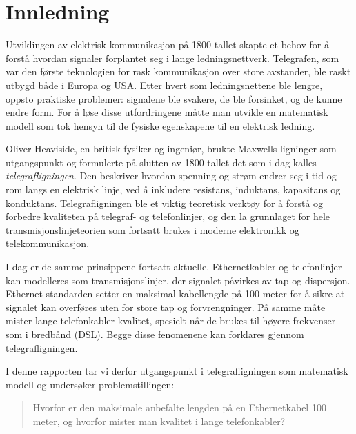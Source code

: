 \section{Innledning}

Utviklingen av elektrisk kommunikasjon på 1800-tallet skapte et behov for å forstå hvordan 
signaler forplantet seg i lange ledningsnettverk. Telegrafen, som var den første teknologien 
for rask kommunikasjon over store avstander, ble raskt utbygd både i Europa og USA. Etter hvert 
som ledningsnettene ble lengre, oppsto praktiske problemer: signalene ble svakere, de ble 
forsinket, og de kunne endre form. For å løse disse utfordringene måtte man utvikle en matematisk 
modell som tok hensyn til de fysiske egenskapene til en elektrisk ledning.

Oliver Heaviside, en britisk fysiker og ingeniør, brukte Maxwells ligninger som utgangspunkt og 
formulerte på slutten av 1800-tallet det som i dag kalles \textit{telegrafligningen}. Den beskriver 
hvordan spenning og strøm endrer seg i tid og rom langs en elektrisk linje, ved å inkludere 
resistans, induktans, kapasitans og konduktans. Telegrafligningen ble et viktig teoretisk verktøy 
for å forstå og forbedre kvaliteten på telegraf- og telefonlinjer, og den la grunnlaget for hele 
transmisjonslinjeteorien som fortsatt brukes i moderne elektronikk og telekommunikasjon.

I dag er de samme prinsippene fortsatt aktuelle. Ethernetkabler og telefonlinjer kan modelleres 
som transmisjonslinjer, der signalet påvirkes av tap og dispersjon. Ethernet-standarden setter en 
maksimal kabellengde på 100 meter for å sikre at signalet kan overføres uten for store tap og 
forvrengninger. På samme måte mister lange telefonkabler kvalitet, spesielt når de brukes til høyere 
frekvenser som i bredbånd (DSL). Begge disse fenomenene kan forklares gjennom telegrafligningen.

I denne rapporten tar vi derfor utgangspunkt i telegrafligningen som matematisk modell og undersøker 
problemstillingen:

\begin{quote}
Hvorfor er den maksimale anbefalte lengden på en Ethernetkabel 100 meter, og hvorfor mister man 
kvalitet i lange telefonkabler?
\end{quote}
